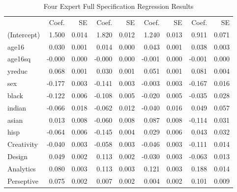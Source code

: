 \documentclass[12pt]{article}
\begin{document}
\begin{landscape}
\begin{table} \centering
  \caption{Four Expert Full Specification Regression Results}
    \begin{threeparttable}
      {\small
      \begin{tabular}[l]{l r r r r r r r r}
\cmidrule{1-9}    
                 & Coef.  &  SE   &  Coef.  &  SE   &  Coef.  &  SE   &  Coef.  &  SE  \\
\cmidrule(l){2-3}  \cmidrule(l){4-5}  \cmidrule(l){6-7}   \cmidrule(l){8-9}   
(Intercept)      &    1.500  &    0.014   &     1.820  &    0.012   &     1.240  &    0.013   &     0.911  &    0.071  \\
age16            &    0.030  &    0.001   &     0.014  &    0.000   &     0.043  &    0.001   &     0.038  &    0.003  \\
age16sq          &   -0.000  &    0.000   &    -0.000  &    0.000   &    -0.001  &    0.000   &    -0.001  &    0.000  \\
yreduc           &    0.068  &    0.001   &     0.030  &    0.001   &     0.051  &    0.001   &     0.081  &    0.004  \\
sex              &   -0.177  &    0.003   &    -0.141  &    0.003   &    -0.003  &    0.003   &    -0.167  &    0.016  \\
black            &   -0.122  &    0.006   &    -0.108  &    0.005   &    -0.020  &    0.005   &    -0.035  &    0.028  \\
indian           &   -0.066  &    0.018   &    -0.062  &    0.012   &    -0.040  &    0.016   &     0.049  &    0.057  \\
asian            &    0.013  &    0.008   &    -0.060  &    0.008   &     0.087  &    0.008   &    -0.114  &    0.031  \\
hisp             &   -0.064  &    0.006   &    -0.145  &    0.004   &     0.029  &    0.006   &     0.043  &    0.032  \\
Creativity       &   -0.040  &    0.003   &    -0.058  &    0.003   &    -0.046  &    0.003   &    -0.111  &    0.014  \\
Design           &    0.049  &    0.002   &     0.113  &    0.002   &    -0.030  &    0.003   &    -0.063  &    0.013  \\
Analytics        &    0.080  &    0.003   &     0.113  &    0.003   &     0.121  &    0.003   &     0.188  &    0.014  \\
Perseptive       &    0.075  &    0.002   &     0.007  &    0.002   &     0.004  &    0.002   &     0.101  &    0.009  \\

\end{tabular}}
\end{threeparttable}
\end{table}
\end{landscape}
\end{document}
